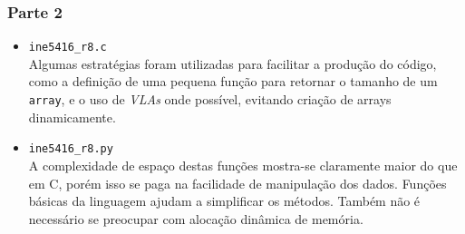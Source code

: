 \documentclass{article}
\begin{document}
\subsubsection*{Parte 2}
\begin{itemize}
    \item \texttt{ine5416\_r8.c} \\
    Algumas estratégias foram utilizadas para facilitar a produção do código,
    como a definição de uma pequena função para retornar o tamanho de um
    \texttt{array}, e o uso de \textit{VLAs} onde possível, evitando criação
    de arrays dinamicamente.

    \item \texttt{ine5416\_r8.py} \\
    A complexidade de espaço destas funções mostra-se claramente maior do que
    em C, porém isso se paga na facilidade de manipulação dos dados. Funções
    básicas da linguagem ajudam a simplificar os métodos. Também não é
    necessário se preocupar com alocação dinâmica de memória.
\end{itemize}
\end{document}
